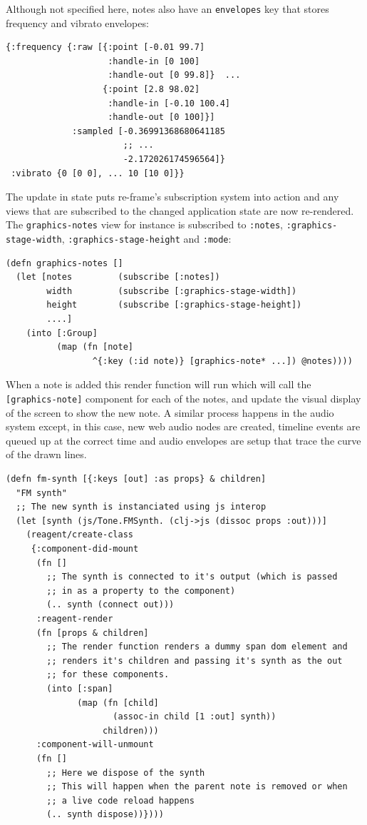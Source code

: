 \documentclass[12pt]{report}
\begin{document}
Although not specified here, notes also have an \texttt{envelopes} key that stores
frequency and vibrato envelopes:
\begin{footnotesize}
\begin{verbatim}
{:frequency {:raw [{:point [-0.01 99.7]
                    :handle-in [0 100]
                    :handle-out [0 99.8]}  ...
                   {:point [2.8 98.02]
                    :handle-in [-0.10 100.4]
                    :handle-out [0 100]}]
             :sampled [-0.36991368680641185
                       ;; ...
                       -2.172026174596564]}
 :vibrato {0 [0 0], ... 10 [10 0]}}
\end{verbatim}
\end{footnotesize}
The update in state puts re-frame's subscription system into action and any
views that are subscribed to the changed application state are now re-rendered.
The \texttt{graphics-notes} view for instance is subscribed to \texttt{:notes},
\texttt{:graphics-stage-width}, \texttt{:graphics-stage-height} and \texttt{:mode}:
\begin{footnotesize}
\begin{verbatim}
(defn graphics-notes []
  (let [notes         (subscribe [:notes])
        width         (subscribe [:graphics-stage-width])
        height        (subscribe [:graphics-stage-height])
        ....]
    (into [:Group]
          (map (fn [note]
                 ^{:key (:id note)} [graphics-note* ...]) @notes))))
\end{verbatim}
\end{footnotesize}
When a note is added this render function will run which will call the
\texttt{[graphics-note]} component for each of the notes, and update the visual
display of the screen to show the new note. A similar process happens in the
audio system except, in this case, new web audio nodes are created, timeline
events are queued up at the correct time and audio envelopes are setup that
trace the curve of the drawn lines.     
\begin{footnotesize}
\begin{verbatim}
(defn fm-synth [{:keys [out] :as props} & children]
  "FM synth"
  ;; The new synth is instanciated using js interop
  (let [synth (js/Tone.FMSynth. (clj->js (dissoc props :out)))]
    (reagent/create-class
     {:component-did-mount
      (fn []
        ;; The synth is connected to it's output (which is passed
        ;; in as a property to the component)
        (.. synth (connect out)))
      :reagent-render
      (fn [props & children]
        ;; The render function renders a dummy span dom element and
        ;; renders it's children and passing it's synth as the out
        ;; for these components.
        (into [:span]
              (map (fn [child]
                     (assoc-in child [1 :out] synth))
                   children)))
      :component-will-unmount
      (fn []
        ;; Here we dispose of the synth
        ;; This will happen when the parent note is removed or when
        ;; a live code reload happens
        (.. synth dispose))})))
\end{verbatim}
\end{footnotesize}
\end{document}

